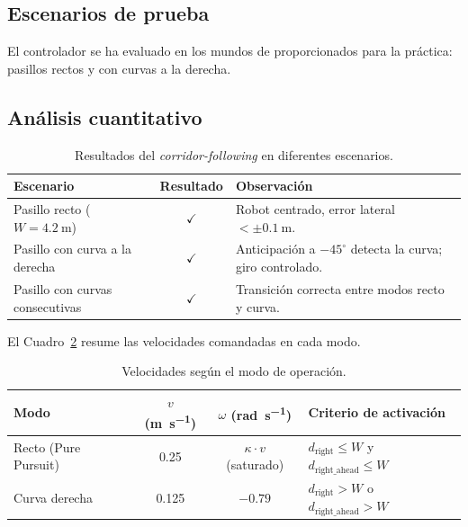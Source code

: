 \documentclass[12pt]{article}
\begin{document}
\subsection{Escenarios de prueba}
El controlador se ha evaluado en los mundos de \coppelia{} proporcionados para la pr\'{a}ctica: pasillos rectos y con curvas a la derecha.

\subsection{An\'{a}lisis cuantitativo}

\begin{table}[H]
  \centering
  \caption{Resultados del \emph{corridor-following} en diferentes escenarios.}
  \label{tab:resultados}
  \begin{tabularx}{0.98\linewidth}{l c X}
    \toprule
    \textbf{Escenario} & \textbf{Resultado} & \textbf{Observaci\'{o}n} \\
    \midrule
    Pasillo recto ($W = \SI{4.2}{\meter}$) & $\checkmark$ & Robot centrado, error lateral $< \pm\SI{0.1}{\meter}$. \\
    Pasillo con curva a la derecha & $\checkmark$ & Anticipaci\'{o}n a $-45^\circ$ detecta la curva; giro controlado. \\
    Pasillo con curvas consecutivas & $\checkmark$ & Transici\'{o}n correcta entre modos recto y curva. \\
    \bottomrule
  \end{tabularx}
\end{table}

El Cuadro~\ref{tab:velocidades} resume las velocidades comandadas en cada modo.

\begin{table}[H]
  \centering
  \caption{Velocidades seg\'{u}n el modo de operaci\'{o}n.}
  \label{tab:velocidades}
  \begin{tabularx}{0.85\linewidth}{l c c X}
    \toprule
    \textbf{Modo} & $v$ (\si{\meter\per\second}) & $\omega$ (\si{\radian\per\second}) & \textbf{Criterio de activaci\'{o}n} \\
    \midrule
    Recto (Pure Pursuit) & 0.25 & $\kappa \cdot v$ (saturado) & $d_\text{right} \leq W$ y $d_\text{right\_ahead} \leq W$ \\
    Curva derecha         & 0.125 & $-0.79$ & $d_\text{right} > W$ o $d_\text{right\_ahead} > W$ \\
    \bottomrule
  \end{tabularx}
\end{table}
\end{document}
